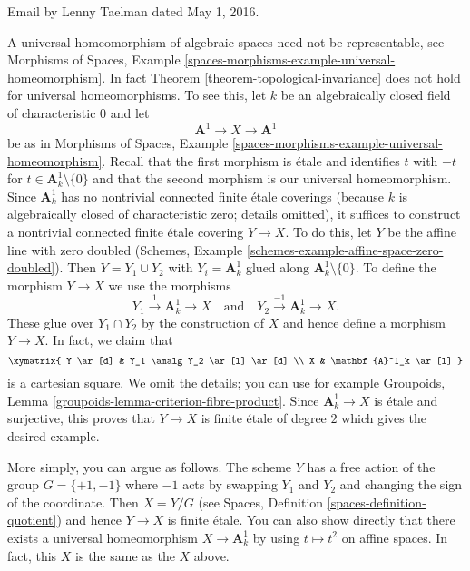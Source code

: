 \begin{remark}
\label{remark-topological-invariance-etale-site}
\begin{reference}
Email by Lenny Taelman dated May 1, 2016.
\end{reference}
A universal homeomorphism of algebraic spaces need not be representable, see
Morphisms of Spaces,
Example \ref{spaces-morphisms-example-universal-homeomorphism}.
In fact Theorem \ref{theorem-topological-invariance} does
not hold for universal homeomorphisms. To see this, let $k$ be an
algebraically closed field of characteristic $0$ and let
$$
\mathbf{A}^1 \to X \to \mathbf{A}^1
$$
be as in Morphisms of Spaces,
Example \ref{spaces-morphisms-example-universal-homeomorphism}.
Recall that the first morphism is \'etale and identifies
$t$ with $-t$ for $t \in \mathbf{A}^1_k \setminus \{0\}$
and that the second morphism is our universal homeomorphism.
Since $\mathbf{A}^1_k$ has no
nontrivial connected finite \'etale coverings
(because $k$ is algebraically closed of characteristic zero; details omitted),
it suffices to construct a nontrivial connected finite \'etale covering
$Y \to X$. To do this, let $Y$ be the affine line
with zero doubled
(Schemes, Example \ref{schemes-example-affine-space-zero-doubled}).
Then $Y = Y_1 \cup Y_2$ with $Y_i = \mathbf{A}^1_k$ glued
along $\mathbf{A}^1_k \setminus \{0\}$.
To define the morphism $Y \to X$ we use the morphisms
$$
Y_1 \xrightarrow{1} \mathbf{A}^1_k \to X
\quad\text{and}\quad
Y_2 \xrightarrow{-1} \mathbf{A}^1_k \to X.
$$
These glue over $Y_1 \cap Y_2$ by the construction of $X$ and
hence define a morphism $Y \to X$. In fact, we claim that
$$
\xymatrix{
Y \ar[d] & Y_1 \amalg Y_2 \ar[l] \ar[d] \\
X & \mathbf{A}^1_k \ar[l]
}
$$
is a cartesian square. We omit the details; you can use for example
Groupoids, Lemma \ref{groupoids-lemma-criterion-fibre-product}.
Since $\mathbf{A}^1_k \to X$ is \'etale and
surjective, this proves that $Y \to X$
is finite \'etale of degree $2$ which gives the desired example.

\medskip\noindent
More simply, you can argue as follows. The scheme $Y$ has a free
action of the group $G = \{+1, -1\}$ where $-1$ acts by swapping
$Y_1$ and $Y_2$ and changing the sign of the coordinate. Then
$X = Y/G$ (see Spaces, Definition \ref{spaces-definition-quotient})
and hence $Y \to X$ is finite \'etale. You can also show directly
that there exists a universal homeomorphism $X \to \mathbf{A}^1_k$
by using $t \mapsto t^2$ on affine spaces. In fact, this $X$ is
the same as the $X$ above.
\end{remark}








